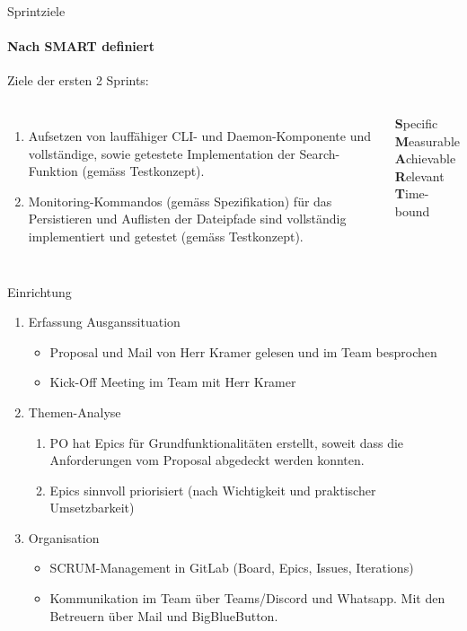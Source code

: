 \documentclass[
    ngerman,%
    authorontitle=true,
]{bfhbeamer}
\begin{document}
    \begin{frame}{Sprintziele}
        \framesubtitle{Nach SMART definiert}
        Ziele der ersten 2 Sprints:
        \begin{columns}
            \begin{enumerate}
                \item Aufsetzen von lauffähiger CLI- und Daemon-Komponente und
                vollständige, sowie getestete Implementation der Search-Funktion (gemäss Testkonzept).
                \item Monitoring-Kommandos (gemäss Spezifikation) für das Persistieren
                und Auflisten der Dateipfade sind vollständig implementiert und
                getestet (gemäss Testkonzept).
            \end{enumerate}

            \textbf{S}pecific\\
            \textbf{M}easurable\\
            \textbf{A}chievable\\
            \textbf{R}elevant\\
            \textbf{T}ime-bound
        \end{columns}

    \end{frame}

    \begin{frame}{Einrichtung}
        \begin{enumerate}
            \item Erfassung Ausganssituation
            \begin{itemize}
                \item Proposal und Mail von Herr Kramer gelesen und im Team besprochen
                \item Kick-Off Meeting im Team mit Herr Kramer
            \end{itemize}
            \item Themen-Analyse
            \begin{enumerate}
                \item PO hat Epics für Grundfunktionalitäten erstellt, soweit dass die Anforderungen vom Proposal abgedeckt werden konnten.
                \item Epics sinnvoll priorisiert (nach Wichtigkeit und praktischer Umsetzbarkeit)
            \end{enumerate}
            \item Organisation
            \begin{itemize}
                \item SCRUM-Management in GitLab (Board, Epics, Issues, Iterations)
                \item Kommunikation im Team über Teams/Discord und Whatsapp.
                Mit den Betreuern über Mail und BigBlueButton.
            \end{itemize}
        \end{enumerate}
    \end{frame}
\end{document}
